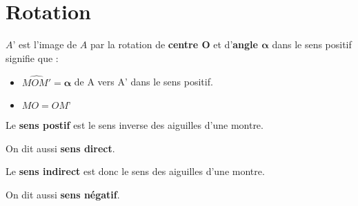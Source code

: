 \section{Rotation}
\begin{definition}
    $A’$ est l’image de $A$ par la rotation de \textbf{centre $\mathbf{O}$} et d’\textbf{angle $\mathbf{\alpha}$} dans le sens positif signifie que : 
    \begin{itemize}
        \item $\widehat{MOM'}=\mathbf{\alpha}$ de A vers A’ dans le sens positif.
        \item $MO = OM’$
    \end{itemize}
\end{definition}

\begin{definition}
    Le \textbf{sens postif} est le sens inverse des aiguilles d'une montre.
    
    On dit aussi \textbf{sens direct}.
\end{definition}

\begin{remarque}
    Le \textbf{sens indirect} est donc le sens des aiguilles d'une montre.
    
    On dit aussi \textbf{sens négatif}.
\end{remarque}

